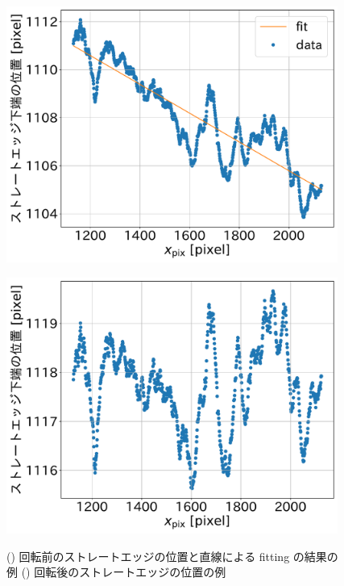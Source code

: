 \documentclass[../../main.tex]{subfiles}
\begin{document}
\begin{figure}[H]
    \begin{minipage}[b]{0.5\hsize}
        \centering
        \includegraphics[width=0.97\textwidth]{wiresag/wiresag_straight_edge_positions_line.pdf}
        \subcaption{}
        \label{fig:wiresag_straight_edge_positions_line}
    \end{minipage}
    \begin{minipage}[b]{0.5\hsize}
        \centering
        \includegraphics[width=0.97\textwidth]{wiresag/wiresag_straight_edge_positions_rot.pdf}
        \subcaption{}
        \label{fig:wiresag_straight_edge_positions_rot}
    \end{minipage}
    \caption{() 回転前のストレートエッジの位置と直線による fitting の結果の例
             () 回転後のストレートエッジの位置の例
             }
    \label{fig:wiresag_straight_edge}
\end{figure}
\end{document}
